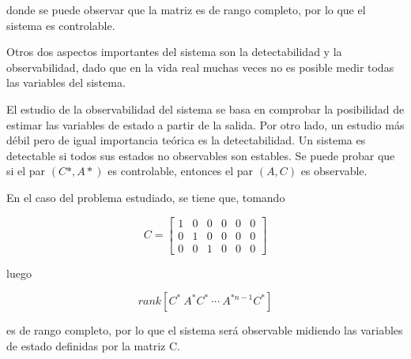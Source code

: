 donde se puede observar que la matriz es de rango completo, por lo que el sistema es controlable.


Otros dos aspectos importantes del sistema son la detectabilidad y la observabilidad, dado que en la vida real muchas veces no es posible medir todas las variables del sistema. 

El estudio de la observabilidad del sistema se basa en comprobar la posibilidad de estimar las variables de estado a partir de la salida. Por otro lado, un estudio más débil pero de igual importancia teórica es la detectabilidad. Un sistema es detectable si todos sus estados no observables son estables. Se puede probar que si el par $(C*,A*)$ es controlable, entonces el par $(A,C)$ es observable. 

En el caso del problema estudiado, se tiene que, tomando

\begin{equation}
C = 	\begin{bmatrix}
1 & 0 & 0 & 0 & 0 & 0\\
0 & 1 & 0 & 0 & 0 & 0\\
0 & 0 & 1 & 0 & 0 & 0
\end{bmatrix}
\end{equation}

luego

\begin{equation}
rank[C^* \ A^*C^* \ \cdots \ A^{*n-1}C^*]
\end{equation}

es de rango completo, por lo que el sistema será observable midiendo las variables de estado definidas por la matriz C.








%